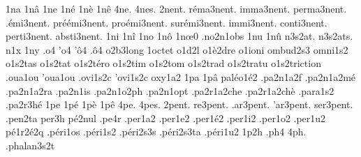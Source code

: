 {%
1na
1n\^a
1ne
1n\'e
1n\`e
1n\^e
4ne.
4nes.
          2nent. %
    r\'ema3nent.
      imma3nent.
     perma3nent.
    .\'emi3nent.
pr\'e\'emi3nent.
  pro\'emi3nent.
  sur\'emi3nent.
      immi3nent.
     conti3nent.
     perti3nent.
     absti3nent.
%
1ni
1n\^i
1no
1n\^o
1n\oe0 %
                    .no2n1obs
1nu
1n\^u
                    n3s2at.
                    n3s2ats.
n1x
1ny
.o4
'o4
'\^o4
.\^o4
                    o2b3long
                    1octet %
                    o1d2l
                    o1\`e2dre
                    o1ioni
                    ombud2s3
                    omni1s2
                    o1s2tas
                    o1s2tat
                    o1s2t\'ero
                    o1s2tim
                    o1s2tom
                    o1s2trad
                    o1s2tratu
                    o1s2triction
                    .oua1ou
                    'oua1ou
                    .ovi1s2c
                    'ovi1s2c
                    oxy1a2
1pa
1p\^a
                    pal\'eo1\'e2
                    .pa2n1a2f
                    .pa2n1a2m\'e
                    .pa2n1a2ra
                    .pa2n1is
                    .pa2n1o2ph
                    .pa2n1opt
                    .pa2r1a2che
                    .pa2r1a2ch\`e
                    .para1s2
                    .pa2r3h\'e
1pe
1p\'e
1p\`e
1p\^e
4pe.
4pes.
   2pent.
 re3pent.
.ar3pent.
'ar3pent.
ser3pent.
%
                    .pen2ta %
                    per3h
                    p\'e2nul %
                    .pe4r
                    .per1a2
                    .per1e2
                    .per1\'e2
                    .per1i2
                    .per1o2
                    .per1u2
                    p\'e1r2\'e2q %
                    .p\'eri1os
                    .p\'eri1s2
                    .p\'eri2s3s
                    .p\'eri2s3ta
                    .p\'eri1u2
1p2h
.ph4
4ph.
                    .phalan3s2t
}

